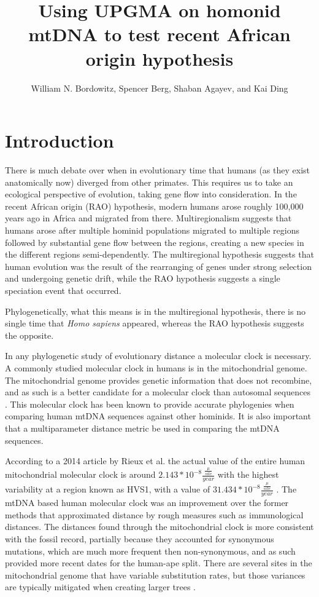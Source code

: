 \documentclass[a4paper]{article}
\title{Using UPGMA on homonid mtDNA to test recent African origin hypothesis}
\author{William N. Bordowitz, Spencer Berg, Shaban Agayev, and Kai Ding}
\begin{document}
\maketitle
\nocite{globalalign}

\section{Introduction}

There is much debate over when in evolutionary time that humans (as they exist anatomically now) diverged from other primates. This requires us to take an ecological perspective of evolution, taking gene flow into consideration. In the recent African origin (RAO) hypothesis, modern humans arose roughly 100,000 years ago \cite{coolreview}
in Africa and migrated from there. Multiregionalism suggests that humans arose after multiple hominid populations migrated to multiple regions followed by substantial gene flow between the regions, creating a new species in the different regions semi-dependently. The multiregional hypothesis suggests that human evolution was the result of the rearranging of genes under strong selection and undergoing genetic drift, while the RAO hypothesis suggests a single speciation event that occurred.  \cite{fossils}

Phylogenetically, what this means is in the multiregional hypothesis, there is no single time that \textit{Homo sapiens} appeared, whereas the RAO hypothesis suggests the opposite. \cite{fossils} 

In any phylogenetic study of evolutionary distance a molecular clock is necessary. A commonly studied molecular clock in humans is in the mitochondrial genome. The mitochondrial genome provides genetic information that does not recombine, and as such is a better candidate for a molecular clock than autosomal sequences \cite{elsevierbs}.
This molecular clock has been known to provide accurate phylogenies when comparing human mtDNA sequences against other hominids. It is also important that a multiparameter distance metric be used in comparing the mtDNA sequences. 

According to a 2014 article by Rieux et al. the actual value of the entire human mitochondrial molecular clock is around $2.143 * 10^{-8} \frac{\frac{\mu}{site}}{year}$ with the highest variability at a region known as HVS1, with a value of $31.434 * 10^{-8} \frac{\frac{\mu}{site}}{year}$ \cite{mtdnastuff}.   
The mtDNA based human molecular clock was an improvement over the former methods that approximated distance by rough measures such as immunological distances. 
The distances found through the mitochondrial clock is more consistent with the fossil record, partially because they accounted for synonymous mutations, which are much more frequent then non-synonymous, and as such provided more recent dates for the human-ape split. There are several sites in the mitochondrial genome that have variable substitution rates, but those variances are typically mitigated when creating larger trees \cite{mtdnastuff}.
\end{document}
